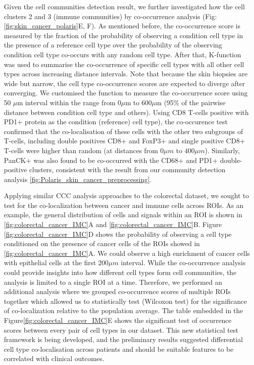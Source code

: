 Given the cell communities detection result, we further investigated how the cell clusters 2 and 3 (immune communities) by co-occurrence analysis (Fig: \ref{fig:skin_cancer_polaris}E, F). As mentioned before, the co-occurrence score is measured by the fraction of the probability of observing a condition cell type in the presence of a reference cell type over the probability of the observing condition cell type co-occurs with any random cell type. After that, K-function was used to summarise the co-occurrence of specific cell types with all other cell types across increasing distance intervals. Note that because the skin biopsies are wide but narrow, the cell type co-occurrence scores are expected to diverge after converging. We customised the function to measure the co-occurrence score using 50 $\mu$m interval within the range from 0$\mu$m to 600$\mu$m (95\% of the pairwise distance between condition cell type and others). Using CD8 T-cells positive with PD1+ protein as the condition (reference) cell type), the co-occurence test confirmed that the co-localisation of these cells with the other two subgroups of T-cells, including double positives CD8+ and FoxP3+ and single positive CD8+ T-cells were higher than random (at distances from $0\mu m$ to $400 \mu m$). Similarly, PanCK+ was also found to be co-occurred with the CD68+ and PD1+ double-positive clusters, consistent with the result from our community detection analysis \ref{fig:Polaris_skin_cancer_preprocessing}.     

Applying similar CCC analysis approaches to the colorectal dataset, we sought to test for the co-localization between cancer and immune cells across ROIs. As an example, the general distribution of cells and signals within an ROI is shown in \ref{fig:colorectal_cancer_IMC}A and \ref{fig:colorectal_cancer_IMC}B. Figure \ref{fig:colorectal_cancer_IMC}D shows the probability of observing a cell type conditioned on the presence of cancer cells of the ROIs showed in \ref{fig:colorectal_cancer_IMC}A. We could observe a high enrichment of cancer cells with epithelial cells at the first $200\mu m$ interval. While the co-occurrence analysis could provide insights into how different cell types form cell communities, the analysis is limited to a single ROI at a time. Therefore, we performed an additional analysis where we grouped co-occurrence scores of multiple ROIs together which allowed us to statistically test (Wilcoxon test) for the significance of co-localization relative to the population average. The table embedded in the Figure\ref{fig:colorectal_cancer_IMC}E shows the significant test of occurrence scores between every pair of cell types in our dataset. This new statistical test framework is being developed, and the preliminary results suggested differential cell type co-localisation across patients and should be suitable features to be correlated with clinical outcomes.


